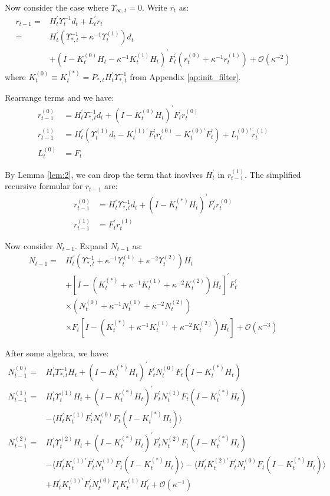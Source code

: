 \documentclass[12pt]{article}
\numberwithin{equation}{section}
\begin{document}
Now consider the case where $\Upsilon_{\infty,t}=0$. Write $r_t$ as:
\begin{align*}
    r_{t-1} =& H_t^{'}\Upsilon_t^{-1}d_t + L_t^{'}r_t \\
    =& H_t^{'}(\Upsilon_{*,t}^{-1}+\kappa^{-1}\Upsilon_t^{(1)})d_t \\
    &+(I-K_t^{(0)}H_t-\kappa^{-1}K_t^{(1)}H_t)^{'}F_t^{'}(r_t^{(0)}+\kappa^{-1}r_t^{(1)}) + \mathcal{O}(\kappa^{-2})
\end{align*}
where $K_t^{(0)}\equiv K_t^{(*)}=P_{*,t}H_t^{'}\Upsilon_{*,t}^{-1}$ from Appendix \ref{ap:init_filter}.

Rearrange terms and we have:
\begin{align*}
    r_{t-1}^{(0)} &= H_t^{'}\Upsilon_{*,t}^{-1}d_t + (I-K_{t}^{(0)}H_t)^{'}F_t^{'}r_t^{(0)} \\
    r_{t-1}^{(1)} &= H_t^{'}(\Upsilon_t^{(1)}d_t-K_t^{(1)'}F_t^{'}r_t^{(0)}-K_t^{(0)'}F_t^{'})+L_t^{(0)'}r_t^{(1)} \\
    L_t^{(0)} &= F_t
\end{align*}

By Lemma \ref{lem:2}, we can drop the term that inovlves $H_t^{'}$ in $r_{t-1}^{(1)}$. The simplified recursive formular for $r_{t-1}$ are:
\begin{align*}
    r_{t-1}^{(0)} &= H_t^{'}\Upsilon_{*,t}^{-1}d_t + (I-K_{t}^{(*)}H_t)^{'}F_t^{'}r_t^{(0)} \\
    r_{t-1}^{(1)} &= F_t^{'}r_t^{(1)} 
\end{align*}

Now consider $N_{t-1}$. Expand $N_{t-1}$ as:
\begin{align*}
    N_{t-1} =& H_t^{'}(\Upsilon_{*,t}^{-1}+\kappa^{-1}\Upsilon_{t}^{(1)}+\kappa^{-2}\Upsilon_t^{(2)})H_t \\
    &+ [I-(K_t^{(*)}+\kappa^{-1}K_t^{(1)}+\kappa^{-2}K_t^{(2)})H_t]^{'}F_t^{'} \\
    &\times (N_t^{(0)}+\kappa^{-1}N_t^{(1)}+\kappa^{-2}N_t^{(2)}) \\
    &\times F_t[I-(K_t^{(*)}+\kappa^{-1}K_t^{(1)}+\kappa^{-2}K_t^{(2)})H_t]+\mathcal{O}(\kappa^{-3})
\end{align*}

After some algebra, we have:
\begin{align*}
    N_{t-1}^{(0)} =& H_t^{'}\Upsilon_{*,t}^{-1}H_t+(I-K_t^{(*)}H_t)^{'}F_t^{'}N_t^{(0)}F_t(I-K_t^{(*)}H_t) \\
    N_{t-1}^{(1)} =& H_t^{'}\Upsilon_t^{(1)}H_t + (I-K_t^{(*)}H_t)^{'}F_t^{'}N_t^{(1)}F_{t}(I-K_t^{(*)}H_t) \\
    &- \langle H_t^{'}K_t^{(1)}F_t^{'}N_t^{(0)}F_t(I-K_t^{(*)}H_t)\rangle \\
    N_{t-1}^{(2)} =& H_t^{'}\Upsilon_t^{(2)}H_t + (I-K_t^{(*)}H_t)^{'}F_t^{'}N_t^{(2)}F_t(I-K_t^{(*)}H_t) \\
    &- \langle H_t^{'}K_{t}^{(1)'}F_t^{'}N_t^{(1)}F_t(I-K_t^{(*)}H_t)\rangle -\langle H_t^{'}K_{t}^{(2)'}F_t^{'}N_t^{(0)}F_t(I-K_t^{(*)}H_t)\rangle \\
    &+ H_t^{'}K_t^{(1)'}F_t^{'}N_t^{(0)}F_tK_t^{(1)}H_t^{'} + \mathcal{O}(\kappa^{-1})
\end{align*}
\end{document}
